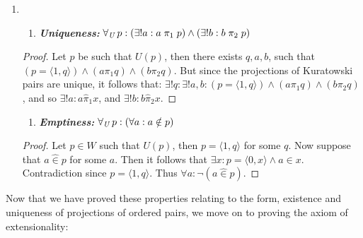 \documentclass[11pt]{report}
\newcommand{\all}[1]{\forall_{\mathit{#1}}\hspace{0.5mm}}
\newcommand{\pleft}{\mathrel{\pi_1}}
\newcommand{\pright}{\mathrel{\pi_2}}
\newcommand{\pair}[2]{\langle #1,#2 \rangle}
\newcommand{\zin}{\mathrel{\widehat{\in}}}
\newcommand{\zpright}{\mathrel{\widehat{\pi}_2}}
\newcommand{\zpleft}{\mathrel{\widehat{\pi}_1}}
\theoremstyle{definition}
\theoremstyle{theorem}
\theoremstyle{lemma}
\begin{document}
\begin{enumerate}[series=axiomlist, label=\Roman*.]
\item \hspace{1mm}
  \begin{enumerate}[resume=sublist, label=(\roman*)]
  \item \textit{\textbf{Uniqueness:}} $\all{U} p: (\exists! a: a\pleft p) \wedge (\exists! b: b\pright p)$
  \end{enumerate}
    \begin{proof}
      Let $p$ be such that $U(p)$, then there exists $q,a,b$, such that $(p = \pair{1}{q}) \wedge (a\pleft q) \wedge (b\pright q)$.
      But since the projections of Kuratowski pairs are unique, it follows that:
      $\exists! q: \exists! a, b:(p=\pair{1}{q})\wedge (a\pleft q) \wedge (b\pright q)$, and so $\exists! a: a\zpleft x$, and $\exists! b: b\zpright x$.
    \end{proof}
  \begin{enumerate}[resume=sublist, label=(\roman*)]
    \item \textit{\textbf{Emptiness:}} $\all{U} p:(\forall a: a\notin p)$
  \end{enumerate}
  \begin{proof}
    Let $p\in W$ such that $U(p)$, then $p = \pair{1}{q}$ for some $q$. Now suppose that $a\zin p$ for some $a$.
    Then it follows that $\exists x: p = \pair{0}{x} \wedge a\in x$.
    Contradiction since $p = \pair{1}{q}$. Thus $\forall a: \neg(a\zin p)$.
  \end{proof}
\end{enumerate}
Now that we have proved these properties relating to the form, existence and uniqueness of projections of ordered pairs, we move on to proving the axiom of extensionality:
\end{document}
